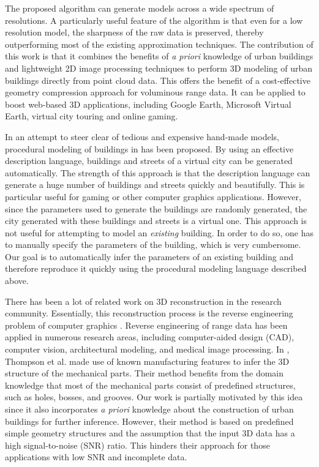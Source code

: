 \documentclass{llncs}
\begin{document}
The proposed algorithm can generate models across a wide spectrum of
resolutions.
A particularly useful feature of the algorithm is that even for a low
resolution model, the sharpness of the raw data is preserved, thereby
outperforming most of the existing approximation techniques.
The contribution of this work is that it combines the benefits of
\emph{a priori} knowledge of urban buildings and lightweight 2D image
processing techniques to perform 3D modeling of urban buildings directly
from point cloud data.
This offers the benefit of a cost-effective geometry compression
approach for voluminous range data.
It can be applied to boost web-based 3D applications, including
Google Earth, Microsoft Virtual Earth, virtual city touring and online gaming.

In an attempt to steer clear of tedious and expensive hand-made models,
procedural modeling of buildings in \cite{PMB_MWH,PMB_WWS} has been proposed.
By using an effective description language, buildings and streets of a virtual
city can be generated automatically.
The strength of this approach is that the description language can generate
a huge number of buildings and streets quickly and beautifully.
This is particular useful for gaming or other computer graphics applications.
However, since the parameters used to generate the buildings are randomly
generated, the city generated with these buildings and streets is a virtual one.
This approach is not useful for attempting to model an {\it existing} building.
In order to do so, one has to manually specify the parameters of the building,
which is very cumbersome.
Our goal is to automatically infer the parameters of an existing building and
therefore reproduce it quickly using the procedural modeling language
described above.

There has been a lot of related work on 3D reconstruction in the research
community.
Essentially, this reconstruction process is the reverse engineering problem
of computer graphics \cite{RE_Fisher}.
Reverse engineering of range data has been applied in numerous research areas,
including computer-aided design (CAD), computer vision, architectural modeling,
and medical image processing.
In \cite{RE_TOGSH}, Thompson et al. made use of known manufacturing features
to infer the 3D structure of the mechanical parts.
Their method benefits from the domain knowledge that most of the mechanical
parts consist of predefined structures, such as holes, bosses, and grooves.
Our work is partially motivated by this idea since it also incorporates
{\it a priori} knowledge about the construction of urban buildings for further
inference.
However, their method is based on predefined simple geometry structures and
the assumption that the input 3D data has a high signal-to-noise (SNR) ratio.
This hinders their approach for those applications with low SNR and
incomplete data.
\end{document}
